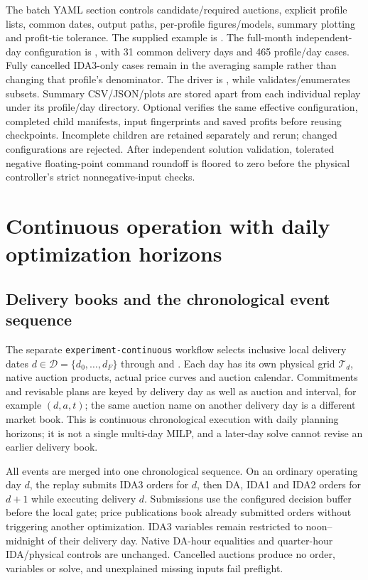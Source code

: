\documentclass[11pt,a4paper]{article}
\begin{document}
The batch YAML section  controls candidate/required
auctions, explicit profile lists, common dates, output paths, per-profile
figures/models, summary plotting and profit-tie tolerance.
The supplied example is
.
The full-month independent-day configuration is
, with 31 common
delivery days and 465 profile/day cases. Fully cancelled IDA3-only cases remain
in the averaging sample rather than changing that profile's denominator.
The driver is , while
 validates/enumerates subsets. Summary CSV/JSON/plots
are stored apart from each individual replay under its profile/day directory.
Optional  verifies the same effective
configuration, completed child manifests, input fingerprints and saved profits
before reusing checkpoints. Incomplete children are retained separately and
rerun; changed configurations are rejected. After independent solution
validation, tolerated negative floating-point command roundoff is floored to
zero before the physical controller's strict nonnegative-input checks.

\section{Continuous operation with daily optimization horizons}

\subsection{Delivery books and the chronological event sequence}
The separate \texttt{experiment-continuous} workflow selects inclusive local
delivery dates $d\in\mathcal D=\{d_0,\ldots,d_F\}$ through
 and . Each day has its
own physical grid $\mathcal T_d$, native auction products, actual price curves
and auction calendar. Commitments and revisable plans are keyed by delivery
day as well as auction and interval, for example $(d,a,t)$; the same auction
name on another delivery day is a different market book. This is continuous
chronological execution with daily planning horizons; it is not a single
multi-day MILP, and a later-day solve cannot revise an earlier delivery book.

All events are merged into one chronological sequence. On an ordinary operating
day $d$, the replay submits IDA3 orders for $d$, then DA, IDA1 and IDA2 orders
for $d+1$ while executing delivery $d$. Submissions use the configured decision
buffer before the local gate; price publications book already submitted orders
without triggering another optimization. IDA3 variables remain restricted to
noon--midnight of their delivery day. Native DA-hour equalities and quarter-hour
IDA/physical controls are unchanged. Cancelled auctions produce no order,
variables or solve, and unexplained missing inputs fail preflight.
\end{document}
